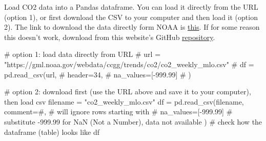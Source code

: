 \documentclass[
  letterpaper,
  DIV=11,
  numbers=noendperiod,
  oneside]{scrreprt}
\newenvironment{Shaded}{\begin{snugshade}}{\end{snugshade}}
\newcommand{\CommentTok}[1]{\textcolor[rgb]{0.37,0.37,0.37}{#1}}
\newcommand{\FloatTok}[1]{\textcolor[rgb]{0.68,0.00,0.00}{#1}}
\newcommand{\NormalTok}[1]{\textcolor[rgb]{0.00,0.23,0.31}{#1}}
\newcommand{\OperatorTok}[1]{\textcolor[rgb]{0.37,0.37,0.37}{#1}}
\newcommand{\StringTok}[1]{\textcolor[rgb]{0.13,0.47,0.30}{#1}}
\begin{document}
Load CO2 data into a Pandas dataframe. You can load it directly from the
URL (option 1), or first download the CSV to your computer and then load
it (option 2). The link to download the data directly form NOAA is
\href{https://gml.noaa.gov/webdata/ccgg/trends/co2/co2_weekly_mlo.csv}{this}.
If for some reason this doesn't work, download from this website's
GitHub
\href{https://raw.githubusercontent.com/yairmau/time-series/main/basics/co2_weekly_mlo.csv}{repository}.

\begin{Shaded}
\begin{Highlighting}[]
\CommentTok{\# option 1: load data directly from URL}
\CommentTok{\# url = "https://gml.noaa.gov/webdata/ccgg/trends/co2/co2\_weekly\_mlo.csv"}
\CommentTok{\# df = pd.read\_csv(url,}
\CommentTok{\#                  header=34,}
\CommentTok{\#                  na\_values=[{-}999.99]}
\CommentTok{\#                  )}

\CommentTok{\# option 2: download first (use the URL above and save it to your computer), then load csv}
\NormalTok{filename }\OperatorTok{=} \StringTok{"co2\_weekly\_mlo.csv"}
\NormalTok{df }\OperatorTok{=}\NormalTok{ pd.read\_csv(filename,}
\NormalTok{                comment}\OperatorTok{=}\StringTok{\textquotesingle{}\#\textquotesingle{}}\NormalTok{,  }\CommentTok{\# will ignore rows starting with \#}
\NormalTok{                 na\_values}\OperatorTok{=}\NormalTok{[}\OperatorTok{{-}}\FloatTok{999.99}\NormalTok{]  }\CommentTok{\# substitute {-}999.99 for NaN (Not a Number), data not available}
\NormalTok{                 )}
\CommentTok{\# check how the dataframe (table) looks like}
\NormalTok{df}
\end{Highlighting}
\end{Shaded}
\end{document}
